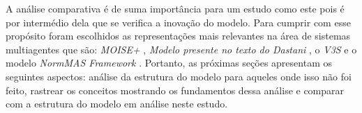 A análise comparativa é de suma importância para um estudo como este pois é por intermédio dela que se verifica a inovação do modelo. Para cumprir com esse
propósito foram escolhidos as representações mais relevantes na área de sistemas multiagentes que são: \textit{MOISE+} \cite{moiseframework}, 
\textit{Modelo presente no texto do Dastani} \cite{dastaniframework}, o \textit{V3S} \cite{v3sframework} e o modelo \textit{NormMAS Framework} \cite{normas}. 
Portanto, as próximas seções apresentam os seguintes aspectos: análise da estrutura do modelo para aqueles onde isso não foi feito, 
rastrear os conceitos mostrando os fundamentos dessa análise e comparar com a estrutura do modelo em análise neste estudo. 